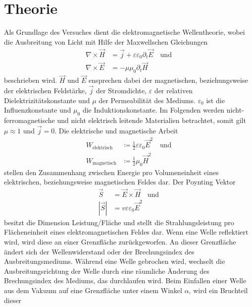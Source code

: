 \section{Theorie}
\label{sec:theorie}

Als Grundlage des Versuches dient die elektromagnetische Wellentheorie, wobei die Ausbreitung von Licht 
mit Hilfe der Maxwellschen Gleichungen 
\begin{align}
    \nabla \times \vec{H}&=\vec{j}+\varepsilon \varepsilon_{0} \partial_t \vec{E} \quad \text{und} \\
    \nabla \times \vec{E}&=-\mu \mu_{0} \partial_t \vec{H}
    \label{eqn:maxwell}
\end{align}
beschrieben wird. $\vec{H} $ und $\vec{E}$ ensprechen dabei der magnetischen, beziehungsweise der elektrischen Feldstärke,
$\vec{j} $ der Stromdichte, $\varepsilon$ der relativen Dielektrizitätskonstante und $\mu$ der Permeabilität des Mediums. $\varepsilon_0$
ist die Influenzkonstante und $\mu_0$ die Induktionskonstante.
Im Folgenden werden nicht-ferromagnetische und nicht elektrisch leitende Materialien betrachtet, somit gilt $\mu \approx 1$
und $\vec{j} =0$.
Die elektrische und magnetische Arbeit 
\begin{align*}
    W_\text{{elektrisch}} &\coloneq \frac{1}{2} \varepsilon \varepsilon_0 \vec{E}^2 \quad \text{und}\\
    W_{\text{magnetisch}} &\coloneq \frac{1}{2} \mu_0 \vec{H}^2
\end{align*}
stellen den Zusammenhang zwischen Energie pro Volumeneinheit eines elektrischen, beziehungsweise magnetischen Feldes dar.
Der Poynting Vektor 
\begin{align}
    \vec{S} &= \vec{E} \times \vec{H} \quad  \text{und}\\
    |\vec{S}| &= v \varepsilon \varepsilon_0 \vec{E}^2
    \label{eqn:poynting}
\end{align}
besitzt die Dimension Leistung/Fläche und stellt die Strahlungsleistung pro Flächeneinheit eines 
elektromagnetischen Feldes dar. Wenn eine Welle reflektiert wird, wird diese an einer Grenzfläche zurückgeworfen.
An dieser Grenzfläche ändert sich der Wellenwiderstand oder der Brechungsindex des Ausbreitungsmediums.
Während eine Welle gebrochen wird, wechselt die Ausbreitungsrichtung der Welle durch eine räumliche Änderung des Brechungsindex
des Mediums, das durchlaufen wird.
Beim Einfallen einer Welle aus dem Vakuum auf eine Grenzfläche unter einem Winkel $\alpha$, wird ein Bruchteil dieser
